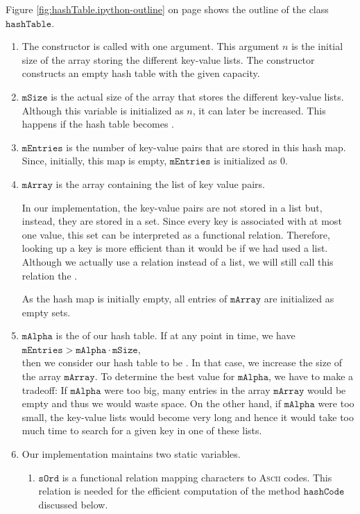 Figure \ref{fig:hashTable.ipython-outline} on page \pageref{fig:hashTable.ipython-outline} shows the outline of the
class $\texttt{hashTable}$.
\begin{enumerate}
\item The constructor is called with one argument.  This argument $n$ is the initial size
      of the array storing the different key-value lists.  The constructor constructs an empty hash
      table with the given capacity.
\item $\texttt{mSize}$ is the actual size of the array that stores the different key-value lists.
      Although this variable is initialized as $n$, it can later be increased.  This happens
      if the hash table becomes .
\item $\texttt{mEntries}$ is the number of key-value pairs that are stored in this hash map.
      Since, initially, this map is empty, $\texttt{mEntries}$ is  initialized as $0$.
\item $\texttt{mArray}$ is the array containing the list of key value pairs.

      In our implementation, the key-value pairs are not stored in a list but, instead, they are
      stored in a set.  Since every key is associated with at most one value, this set can be interpreted as a
      functional relation.  Therefore, looking up a key is more efficient than it would be if we had
      used a list.  Although we actually use a relation instead of a list, we will still call
      this relation the .

      As the hash map is initially empty, all entries of $\texttt{mArray}$ are initialized as empty sets.
\item $\texttt{mAlpha}$ is the  of our hash table.  If at any point in time, we have
      \\[0.2cm]
      \hspace*{1.3cm}
      $\texttt{mEntries} > \texttt{mAlpha} \cdot \texttt{mSize}$,
      \\[0.2cm]
      then we consider our hash table to be .  In that case, we increase the size
      of the array $\texttt{mArray}$.  To determine the best value for $\texttt{mAlpha}$, we have to
      make a tradeoff:  If $\texttt{mAlpha}$ were too big, many entries in the array $\texttt{mArray}$
      would be empty and thus we would waste space.  On the other hand, if $\texttt{mAlpha}$ were too
      small, the key-value lists would become very long and hence it would take too much time to
      search for a given key in one of these lists.
\item Our implementation maintains two static variables.
  \begin{enumerate}
  \item $\texttt{sOrd}$ is a functional relation mapping characters to \textsc{Ascii} codes.
        This relation is needed for the efficient computation of the method $\texttt{hashCode}$
        discussed below.


\end{enumerate}
\end{enumerate}
